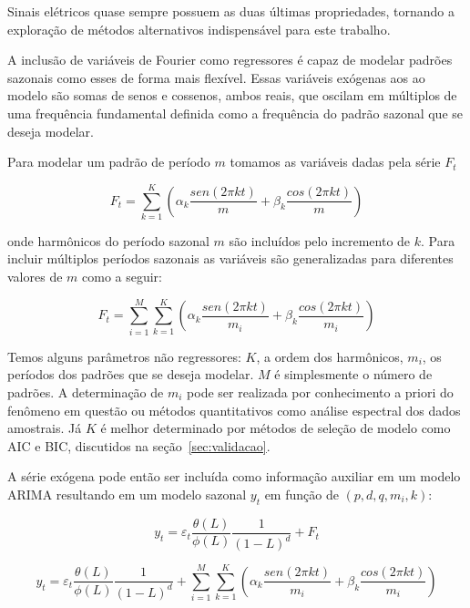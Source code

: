 Sinais elétricos quase sempre possuem as duas últimas propriedades, tornando a
exploração de métodos alternativos indispensável para este trabalho.

A inclusão de variáveis de Fourier como regressores é capaz de modelar
padrões sazonais como esses de forma mais flexível. Essas variáveis exógenas
aos ao modelo são somas de senos e cossenos, ambos reais, que oscilam em
múltiplos de uma frequência fundamental definida como a frequência do padrão
sazonal que se deseja modelar.

Para modelar um padrão de período $m$ tomamos as variáveis dadas pela série
$F_t$

$$ F_t = \sum^K_{k=1} \left(\alpha_k \frac{sen(2\pi k t)}{m} + \beta_k\frac{cos(2\pi k t)}{m}\right) $$

onde harmônicos do período sazonal $m$ são incluídos pelo incremento de $k$.
Para incluir múltiplos períodos sazonais as variáveis são generalizadas para
diferentes valores de $m$ como a seguir:

$$ F_t = \sum^M_{i=1}\sum^K_{k=1} \left(\alpha_k \frac{sen(2\pi k t)}{m_i} + \beta_k\frac{cos(2\pi k t)}{m_i}\right) $$

Temos alguns parâmetros não regressores: $K$, a ordem dos harmônicos, $m_i$, os
períodos dos padrões que se deseja modelar. $M$ é simplesmente o número de
padrões. A determinação de $m_i$ pode ser realizada por conhecimento a priori
do fenômeno em questão ou métodos quantitativos como análise espectral dos
dados amostrais. Já $K$ é melhor determinado por métodos de seleção de modelo
como AIC e BIC, discutidos na seção~\ref{sec:validacao}.

A série exógena pode então ser incluída como informação auxiliar em um modelo
ARIMA resultando em um modelo sazonal $y_t$ em função de $(p, d, q, m_i, k)$:

$$ y_t = \varepsilon_t \frac{\theta(L)}{\phi(L)} \frac{1}{(1-L)^d} + F_t $$

$$ y_t = \varepsilon_t \frac{\theta(L)}{\phi(L)} \frac{1}{(1-L)^d} + \sum^M_{i=1}\sum^K_{k=1} \left(\alpha_k \frac{sen(2\pi k t)}{m_i} + \beta_k\frac{cos(2\pi k t)}{m_i}\right) $$

